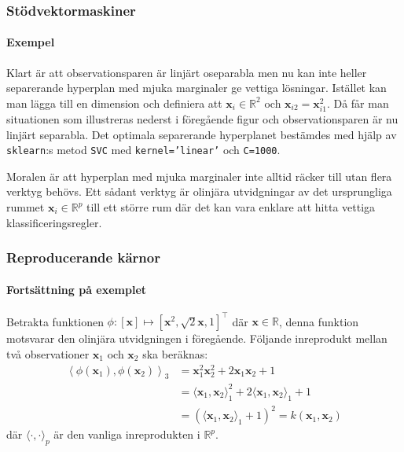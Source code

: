 \documentclass{beamer}
\theoremstyle{definition}
\theoremstyle{remark}
\newcommand{\bfx}{\mathbf{x}}
\begin{document}
\begin{frame}
\frametitle{Stödvektormaskiner}
\framesubtitle{Exempel}
Klart är att observationsparen är linjärt oseparabla men nu kan inte heller separerande hyperplan med mjuka marginaler ge vettiga lösningar. Istället kan man lägga till en dimension och definiera att $\mathbf{x}_i\in\mathbb{R}^2$ och $\mathbf{x}_{i2} = \mathbf{x}_{i1}^2$.
Då får man situationen som illustreras nederst i föregående figur och observationsparen är nu linjärt separabla. Det optimala separerande hyperplanet bestämdes med hjälp av \texttt{sklearn}:s metod \texttt{SVC} med \texttt{kernel='linear'} och \texttt{C=1000}.

Moralen är att hyperplan med mjuka marginaler inte alltid räcker till utan flera verktyg behövs. Ett sådant verktyg är olinjära utvidgningar av det ursprungliga rummet $\mathbf{x}_i\in \mathbb{R}^p$ till ett större rum där det kan vara enklare att hitta vettiga klassificeringsregler.
\end{frame}

\begin{frame}
\frametitle{Reproducerande kärnor}
\framesubtitle{Fortsättning på exemplet}
Betrakta funktionen $\phi:\left[\bfx\right]\longmapsto \left[\bfx^2,\sqrt{2}\bfx, 1\right]^\intercal$ där $\bfx\in\mathbb{R}$, denna funktion motsvarar den olinjära utvidgningen i föregående. Följande inreprodukt mellan två observationer $\mathbf{x}_1$ och $\mathbf{x}_2$ ska beräknas:
\begin{align*}
\left\langle \phi\left(\mathbf{x}_1\right), \phi\left(\mathbf{x}_2\right) \right\rangle_3 &= \bfx_1^2\bfx_2^2 + 2\bfx_1\bfx_2 + 1\\
&= \langle \bfx_1, \bfx_2 \rangle_1^2 + 2\langle \bfx_1, \bfx_2 \rangle_1 + 1\\
&= \left(\langle\bfx_1, \bfx_2 \rangle_1 + 1\right)^2 = k\left(\bfx_1, \bfx_2\right)
\end{align*}
där $\langle \cdot, \cdot \rangle_p$ är den vanliga inreprodukten i $\mathbb{R}^p$.
\end{frame}
\end{document}
